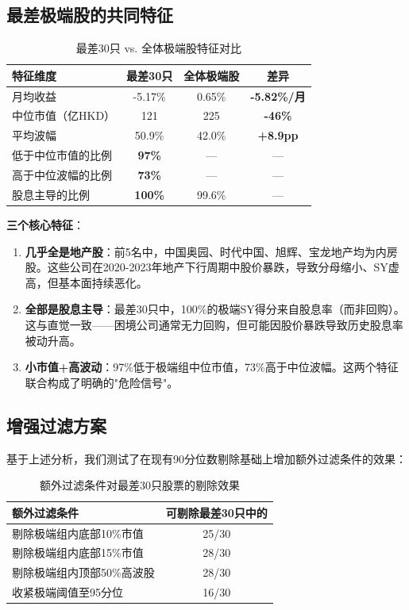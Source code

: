 \documentclass[10pt,a4paper]{ctexart}
\begin{document}
\subsection{最差极端股的共同特征}

\begin{table}[htbp]
\centering
\caption{最差30只 vs. 全体极端股特征对比}
\begin{tabular}{lccc}
\toprule
\textbf{特征维度} & \textbf{最差30只} & \textbf{全体极端股} & \textbf{差异} \\
\midrule
月均收益 & -5.17\% & 0.65\% & \textbf{-5.82\%/月} \\
中位市值（亿HKD） & 121 & 225 & \textbf{-46\%} \\
平均波幅 & 50.9\% & 42.0\% & \textbf{+8.9pp} \\
低于中位市值的比例 & \textbf{97\%} & --- & --- \\
高于中位波幅的比例 & \textbf{73\%} & --- & --- \\
股息主导的比例 & \textbf{100\%} & 99.6\% & --- \\
\bottomrule
\end{tabular}
\end{table}

\textbf{三个核心特征}：
\begin{enumerate}[label=(\arabic*)]
    \item \textbf{几乎全是地产股}：前5名中，中国奥园、时代中国、旭辉、宝龙地产均为内房股。这些公司在2020-2023年地产下行周期中股价暴跌，导致分母缩小、SY虚高，但基本面持续恶化。
    \item \textbf{全部是股息主导}：最差30只中，100\%的极端SY得分来自股息率（而非回购）。这与直觉一致——困境公司通常无力回购，但可能因股价暴跌导致历史股息率被动升高。
    \item \textbf{小市值+高波动}：97\%低于极端组中位市值，73\%高于中位波幅。这两个特征联合构成了明确的"危险信号"。
\end{enumerate}

\subsection{增强过滤方案}

基于上述分析，我们测试了在现有90分位数剔除基础上增加额外过滤条件的效果：

\begin{table}[htbp]
\centering
\caption{额外过滤条件对最差30只股票的剔除效果}
\begin{tabular}{lc}
\toprule
\textbf{额外过滤条件} & \textbf{可剔除最差30只中的} \\
\midrule
剔除极端组内底部10\%市值 & 25/30 \\
剔除极端组内底部15\%市值 & 28/30 \\
剔除极端组内顶部50\%高波股 & 28/30 \\
收紧极端阈值至95分位 & 16/30 \\
\bottomrule
\end{tabular}
\end{table}
\end{document}
